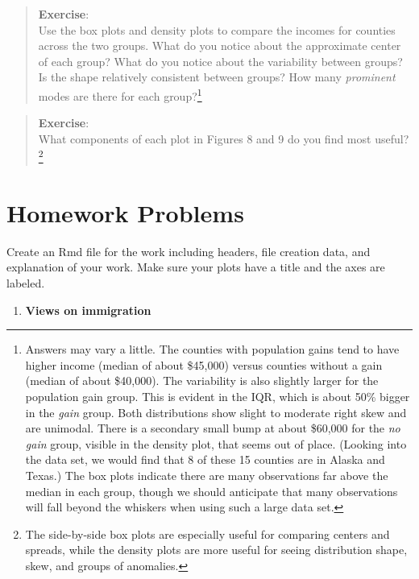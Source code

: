 \documentclass[
]{book}
\providecommand{\tightlist}{%
  \setlength{\itemsep}{0pt}\setlength{\parskip}{0pt}}
\begin{document}
\begin{quote}
\textbf{Exercise}:\\
Use the box plots and density plots to compare the incomes for counties across the two groups. What do you notice about the approximate center of each group? What do you notice about the variability between groups? Is the shape relatively consistent between groups? How many \emph{prominent} modes are there for each group?\footnote{Answers may vary a little. The counties with population gains tend to have higher income (median of about \$45,000) versus counties without a gain (median of about \$40,000). The variability is also slightly larger for the population gain group. This is evident in the IQR, which is about 50\% bigger in the \emph{gain} group. Both distributions show slight to moderate right skew and are unimodal. There is a secondary small bump at about \$60,000 for the \emph{no gain} group, visible in the density plot, that seems out of place. (Looking into the data set, we would find that 8 of these 15 counties are in Alaska and Texas.) The box plots indicate there are many observations far above the median in each group, though we should anticipate that many observations will fall beyond the whiskers when using such a large data set.}
\end{quote}

\begin{quote}
\textbf{Exercise}:\\
What components of each plot in Figures 8 and 9 do you find most useful?\footnote{The side-by-side box plots are especially useful for comparing centers and spreads, while the density plots are more useful for seeing distribution shape, skew, and groups of anomalies.}
\end{quote}

\hypertarget{homework-problems-5}{%
\section{Homework Problems}\label{homework-problems-5}}

Create an Rmd file for the work including headers, file creation data, and explanation of your work. Make sure your plots have a title and the axes are labeled.

\begin{enumerate}
\def\labelenumi{\arabic{enumi}.}
\tightlist
\item
  \textbf{Views on immigration}
\end{enumerate}
\end{document}
